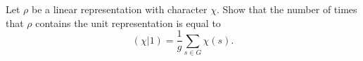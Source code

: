 Let $\rho$ be a linear representation with character $\chi$. Show that the number of times that $\rho$ contains the unit representation is equal to
$$(\chi|1) = \frac{1}{g} \sum_{s \in G} \chi(s).$$